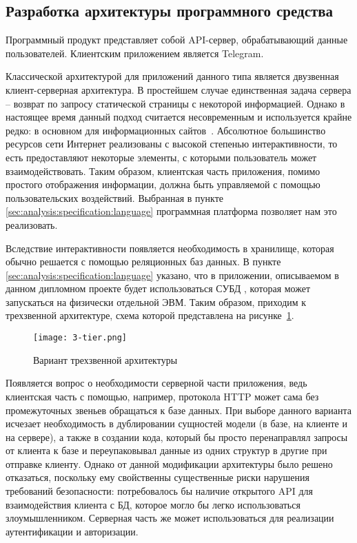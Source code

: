 \subsection{Разработка архитектуры программного средства}
\label{sec:design:architecture}

Программный продукт представляет собой API-сервер, обрабатывающий
данные пользователей. Клиентским приложением является Telegram.

Классической архитектурой для приложений данного типа является двузвенная клиент-серверная архитектура. В простейшем случае единственная задача сервера -- возврат по запросу статической страницы с некоторой информацией. Однако в настоящее время данный подход считается несовременным и используется крайне редко: в основном для информационных сайтов~\cite{from_sites_to_webapps}. Абсолютное большинство ресурсов сети Интернет реализованы с высокой степенью интерактивности, то есть предоставляют некоторые элементы, с которыми пользователь может взаимодействовать. Таким образом, клиентская часть приложения, помимо простого отображения информации, должна быть управляемой с помощью пользовательских воздействий. Выбранная в пункте \ref{sec:analysis:specification:language} программная платформа позволяет нам это реализовать.

Вследствие интерактивности появляется необходимость в хранилище, которая обычно решается с помощью реляционных баз данных. В пункте \ref{sec:analysis:specification:language} указано, что в приложении, описываемом в данном дипломном проекте будет использоваться СУБД \nezaboodka, которая может запускаться на физически отдельной ЭВМ. Таким образом, приходим к трехзвенной архитектуре, схема которой представлена на рисунке~\ref{fig:analysis:specification:language:3-tier}.

\begin{figure}[ht]
\centering
	\texttt{[image: 3-tier.png]}
	\caption{Вариант трехзвенной архитектуры}
	\label{fig:analysis:specification:language:3-tier}
\end{figure}

Появляется вопрос о необходимости серверной части приложения, ведь клиентская часть с помощью, например, протокола HTTP может сама без промежуточных звеньев обращаться к базе данных. При выборе данного варианта исчезает необходимость в дублировании сущностей модели (в базе, на клиенте и на сервере), а также в создании кода, который бы просто перенаправлял запросы от клиента к базе и переупаковывал данные из одних структур в другие при отправке клиенту. Однако от данной модификации архитектуры было решено отказаться, поскольку ему свойственны существенные риски нарушения требований безопасности: потребовалось бы наличие открытого API для взаимодействия клиента с БД, которое могло бы легко использоваться злоумышленником. Серверная часть же может использоваться для реализации аутентификации и авторизации. 
